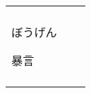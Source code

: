\documentclass[12pt, a4j, landscape, dvipdfmx]{utarticle}
\begin{document}
\begin{minipage}[t][0pt]{\linewidth }
\begin{tabular}{||p{5.5cm}||p{5.5cm}||p{5.5cm}||}
            \rule{0pt}{3ex} \hspace*{.425cm} {\small
            }\tabularnewline \hhline{|:=::=::=:|}
            \rule{0pt}{3ex} \hspace*{-.4cm} {\LARGE
            ぼうげん}\newline \rule{0pt}{3ex} \hspace*{.4cm}
            {\small 暴言}\newline \rule{0pt}{3ex}
            \hspace*{.425cm} {\small }&\rule{0pt}{3ex}
            \hspace*{-.4cm} {\LARGE }\newline
            \rule{0pt}{3ex} \hspace*{.4cm} {\small }\newline
            \rule{0pt}{3ex} \hspace*{.425cm} {\small
            }&\rule{0pt}{3ex} \hspace*{-.4cm} {\LARGE
            }\newline \rule{0pt}{3ex} \hspace*{.4cm} {\small
            }\newline \rule{0pt}{3ex} \hspace*{.425cm}
            {\small }\tabularnewline
            \hhline{|b:=:b:=:b:=:b|} 
        \end{tabular} 
    \end{minipage} 
\end{document}
